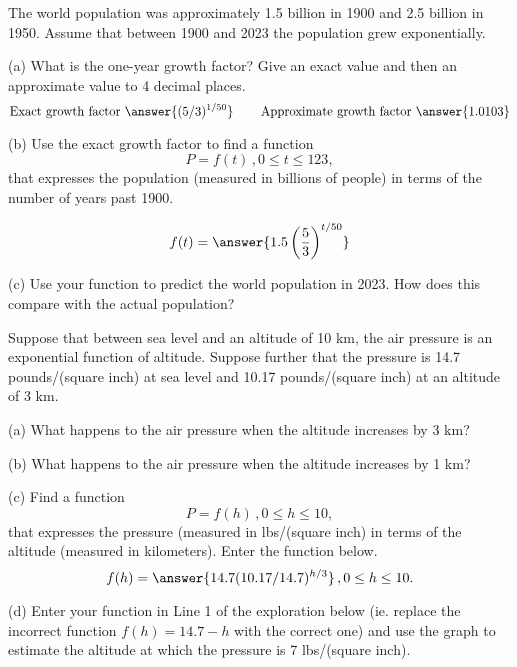 \documentclass{ximera}
\begin{document}
\begin{question}   \label{Q6:ExponentialG}
The world population was approximately 1.5 billion in 1900 and 2.5 billion in 1950. Assume that between 1900 and 2023 the population grew exponentially.

(a) What is the one-year growth factor? Give an exact value and then an approximate value to 4 decimal places.
\[
   \text{Exact growth factor }  \answer{(5/3)^{1/50}} \hskip 0.3 in  \text{Approximate growth factor } \answer{1.0103}
\]

(b) Use the exact growth factor to find a function
\[
     P = f(t) \, , 0\leq t \leq 123 ,
\]
that expresses the population (measured in billions of people) in terms of the number of years past 1900.

\[
   f(t) = \answer{1.5 \left(\frac{5}{3}\right)^{t/50}}
\]

(c) Use your function to predict the world population in 2023. How does this compare with the actual population?

\end{question}


\begin{question}   \label{Q88:ExponentialG}
Suppose that between sea level and an altitude of 10 km, the air pressure is an exponential function of altitude. Suppose further that the pressure is 14.7 pounds/(square inch) at sea level and 10.17 pounds/(square inch) at an altitude of 3 km.

(a) What happens to the air pressure when the altitude increases by 3 km?

(b) What happens to the air pressure when the altitude increases by 1 km?

(c) Find a function
\[
    P = f(h) \, , 0\leq h \leq 10,
\]
that expresses the pressure (measured in lbs/(square inch) in terms of the altitude (measured in kilometers). Enter the function below.
\[
      f(h) = \answer{14.7(10.17/14.7)^{h/3}} \, , 0\leq h \leq 10 .
\]

(d) Enter your function in Line 1 of the exploration below (ie. replace the incorrect function $f(h)=14.7-h$ with the correct one) and use the graph to estimate the altitude at which the pressure is 7 lbs/(square inch).


 
\begin{onlineOnly}
    \begin{center}
\end{center}
\end{onlineOnly}

\end{question}
\end{document}
